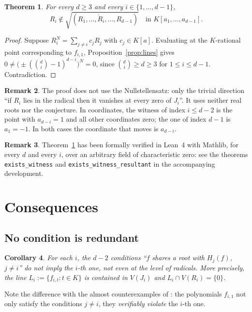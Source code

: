 \documentclass[11pt,reqno]{amsart}
\theoremstyle{plain}
\newtheorem{theorem}{Theorem}[section]
\newtheorem{corollary}[theorem]{Corollary}
\theoremstyle{definition}
\newtheorem{remark}[theorem]{Remark}
\begin{document}
\begin{theorem}\label{thm:all}
For every $d\ge3$ and every $i\in\{1,\dots,d-1\}$,
\[
  R_i\notin\sqrt{(R_1,\dots,\check R_i,\dots,R_{d-1})}\quad\text{in }K[a_1,\dots,a_{d-1}].
\]
\end{theorem}

\begin{proof}
Suppose $R_i^N=\sum_{j\neq i}c_jR_j$ with $c_j\in K[a]$. Evaluating at the
$K$-rational point corresponding to $f_{i,1}$, Proposition~\ref{prop:lines} gives
$0\neq\big(\pm(\binom di-1)^{d-i}\big)^N=0$, since $\binom di\ge d\ge3$ for
$1\le i\le d-1$. Contradiction.
\end{proof}

\begin{remark}
The proof does not use the Nullstellensatz: only the trivial direction ``if $R_i$
lies in the radical then it vanishes at every zero of $J_i$''. It uses neither
real roots nor the conjecture. In coordinates, the witness of index $i\le d-2$ is
the point with $a_{d-i}=1$ and all other coordinates zero; the one of index $d-1$
is $a_1=-1$. In both cases the coordinate that moves is $a_{d-i}$.
\end{remark}

\begin{remark}
Theorem~\ref{thm:all} has been formally verified in Lean~4 with Mathlib, for
every $d$ and every $i$, over an arbitrary field of characteristic zero: see the
theorems \texttt{exists\_witness} and \texttt{exists\_witness\_resultant} in the
accompanying development.
\end{remark}

\section{Consequences}

\subsection{No condition is redundant}

\begin{corollary}\label{cor:nonredundant}
For each $i$, the $d-2$ conditions ``$f$ shares a root with $H_j(f)$, $j\neq i$''
do not imply the $i$-th one, not even at the level of radicals. More precisely,
the line $L_i:=\{f_{i,t}:t\in K\}$ is contained in $V(J_i)$ and
$L_i\cap V(R_i)=\{0\}$.
\end{corollary}

Note the difference with the almost counterexamples of \cite{DdJ}: the
polynomials $f_{i,1}$ not only satisfy the conditions $j\neq i$, they
\emph{verifiably violate} the $i$-th one.
\end{document}
